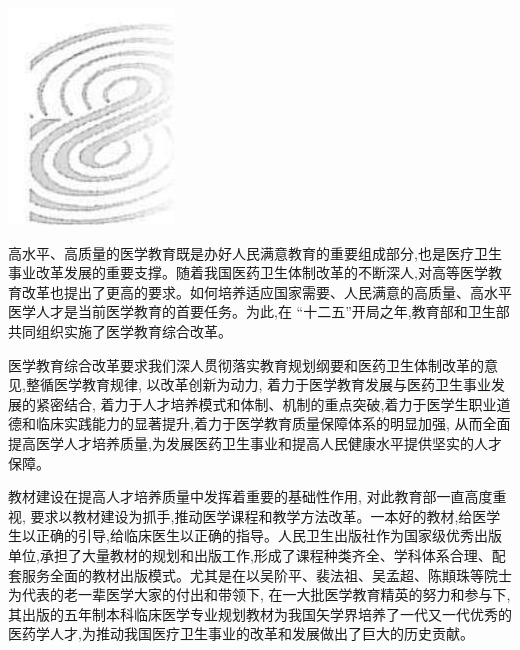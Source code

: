 \documentclass[10pt]{article}
\begin{document}
\begin{center}
\includegraphics[max width=\textwidth]{2024_07_09_002a177993bd97d1d6d7g-009}
\end{center}

高水平、高质量的医学教育既是办好人民满意教育的重要组成部分,也是医疗卫生事业改革发展的重要支撑。随着我国医药卫生体制改革的不断深人,对高等医学教育改革也提出了更高的要求。如何培养适应国家需要、人民满意的高质量、高水平医学人才是当前医学教育的首要任务。为此,在 “十二五”开局之年,教育部和卫生部共同组织实施了医学教育综合改革。

医学教育综合改革要求我们深人贯彻落实教育规划纲要和医药卫生体制改革的意见,整循医学教育规律, 以改革创新为动力, 着力于医学教育发展与医药卫生事业发展的紧密结合, 着力于人才培养模式和体制、机制的重点突破,着力于医学生职业道德和临床实践能力的显著提升,着力于医学教育质量保障体系的明显加强, 从而全面提高医学人才培养质量,为发展医药卫生事业和提高人民健康水平提供坚实的人才保障。

教材建设在提高人才培养质量中发挥着重要的基础性作用, 对此教育部一直高度重视, 要求以教材建设为抓手,推动医学课程和教学方法改革。一本好的教材,给医学生以正确的引导,给临床医生以正确的指导。人民卫生出版社作为国家级优秀出版单位,承担了大量教材的规划和出版工作,形成了课程种类齐全、学科体系合理、配套服务全面的教材出版模式。尤其是在以吴阶平、裴法祖、吴孟超、陈䫏珠等院士为代表的老一辈医学大家的付出和带领下, 在一大批医学教育精英的努力和参与下,其出版的五年制本科临床医学专业规划教材为我国矢学界培养了一代又一代优秀的医药学人才,为推动我国医疗卫生事业的改革和发展做出了巨大的历史贡献。
\end{document}
